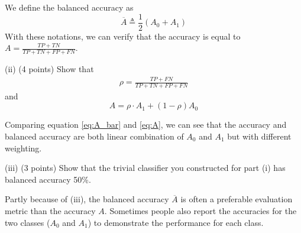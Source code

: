 We define the balanced accuracy as 
\begin{equation}
\overline{A} \triangleq \frac{1}{2} \left(A_0+A_1\right)
\label{eq:A_bar}
\end{equation}
With these notations, we can verify that the accuracy is equal to $
A =\frac{TP+TN}{TP+TN + FP+FN} $. 

(ii) (4 points) Show that 
\begin{align*}
\rho = \frac{TP + FN}{TP+TN + FP+FN}
\end{align*}
and 
\begin{equation}
A = \rho \cdot A_1 + (1-\rho)A_0
\label{eq:A}
\end{equation}


Comparing equation \eqref{eq:A_bar} and \eqref{eq:A}, we can see that the accuracy and balanced accuracy are both linear combination of $A_0$ and $A_1$ but with different weighting. 

(iii) (3 points) Show that the trivial classifier you constructed for part (i) has balanced accuracy 50\%. 

Partly because of (iii), the balanced accuracy $\overline{A}$ is often a preferable evaluation metric than the accuracy $A$. Sometimes people also report the accuracies for the two classes ($A_0$ and $A_1$) to demonstrate the performance for each class. 